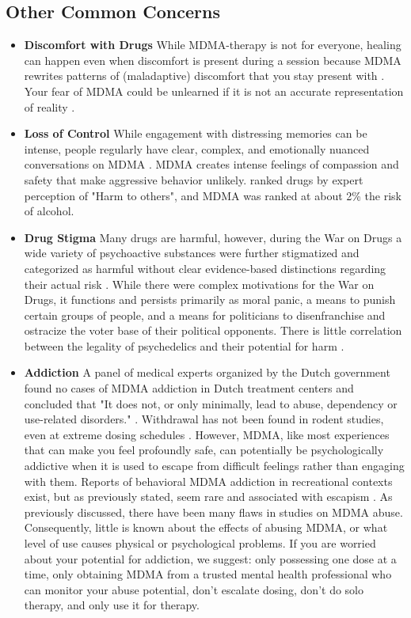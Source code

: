 \documentclass[12pt,letterpaper]{book}
\begin{document}
\subsection*{Other Common Concerns}
\begin{itemize}
    \item \textbf{Discomfort with Drugs}
        While MDMA-therapy is not for everyone, healing can happen even when discomfort is present during a session because MDMA rewrites patterns of (maladaptive) discomfort that you stay present with \cite{fedduciaMDMAMemoryReconsolidation}. Your fear of MDMA could be unlearned if it is not an accurate representation of reality \cite{eckerUnlocking}.
    \item \textbf{Loss of Control}
        While engagement with distressing memories can be intense, people regularly have clear, complex, and emotionally nuanced conversations on MDMA \cite{colbertEvenings,passieHistory}. MDMA creates intense feelings of compassion and safety that make aggressive behavior unlikely. \textcite{nuttDrugHarms} ranked drugs by expert perception of "Harm to others", and MDMA was ranked at about 2\% the risk of alcohol.
    \item \textbf{Drug Stigma}
        Many drugs are harmful, however, during the War on Drugs a wide variety of psychoactive substances were further stigmatized and categorized as harmful without clear evidence-based distinctions regarding their actual risk \cite{alexanderNewJimCrow,nuttDrugHarms}. While there were complex motivations for the War on Drugs, it functions and persists primarily as moral panic, a means to punish certain groups of people, and a means for politicians to disenfranchise and ostracize the voter base of their political opponents. There is little correlation between the legality of psychedelics and their potential for harm \cite{nuttDrugHarms}.
    \item \textbf{Addiction}
        A panel of medical experts organized by the Dutch government found no cases of MDMA addiction in Dutch treatment centers and concluded that "It does not, or only minimally, lead to abuse, dependency or use-related disorders." \cite{netherlandsMDMA}. Withdrawal has not been found in rodent studies, even at extreme dosing schedules \cite{robledoDependence}. However, MDMA, like most experiences that can make you feel profoundly safe, can potentially be psychologically addictive when it is used to escape from difficult feelings rather than engaging with them. Reports of behavioral MDMA addiction in recreational contexts exist, but as previously stated, seem rare and associated with escapism \cite{erowidAbuse}. As previously discussed, there have been many flaws in studies on MDMA abuse. Consequently, little is known about the effects of abusing MDMA, or what level of use causes physical or psychological problems. If you are worried about your potential for addiction, we suggest: only possessing one dose at a time, only obtaining MDMA from a trusted mental health professional who can monitor your abuse potential, don't escalate dosing, don't do solo therapy, and only use it for therapy.

\end{itemize}
\end{document}
